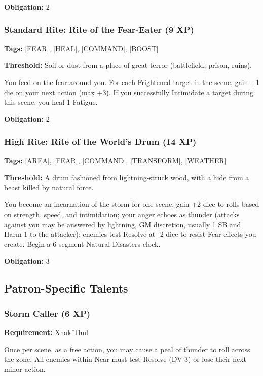 \textbf{Obligation:} 2

\subsubsection{Standard Rite: Rite of the Fear-Eater (9 XP)}

\textbf{Tags:} [FEAR], [HEAL], [COMMAND], [BOOST]

\textbf{Threshold:} Soil or dust from a place of great terror (battlefield, prison, ruins).

You feed on the fear around you. For each Frightened target in the scene, gain +1 die on your next action (max +3). If you successfully Intimidate a target during this scene, you heal 1 Fatigue.

\textbf{Obligation:} 2

\subsubsection{High Rite: Rite of the World's Drum (14 XP)}

\textbf{Tags:} [AREA], [FEAR], [COMMAND], [TRANSFORM], [WEATHER]

\textbf{Threshold:} A drum fashioned from lightning-struck wood, with a hide from a beast killed by natural force.

You become an incarnation of the storm for one scene: gain +2 dice to rolls based on strength, speed, and intimidation; your anger echoes as thunder (attacks against you may be answered by lightning, GM discretion, usually 1 SB and Harm 1 to the attacker); enemies test Resolve at -2 dice to resist Fear effects you create. Begin a 6-segment Natural Disasters clock.

\textbf{Obligation:} 3

\subsection{Patron-Specific Talents}

\subsubsection{Storm Caller (6 XP)}

\textbf{Requirement:} Xhak'Thul

Once per scene, as a free action, you may cause a peal of thunder to roll across the zone. All enemies within Near must test Resolve (DV 3) or lose their next minor action.

